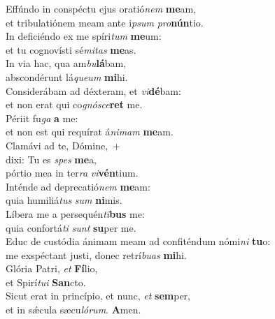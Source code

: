 \evenverse Effúndo in conspéctu ejus oratió\textit{nem} \textbf{me}am,~\*\\
\evenverse et tribulatiónem meam ante i\textit{psum} \textit{pro}\textbf{nún}tio.\\
\oddverse In deficiéndo ex me spíri\textit{tum} \textbf{me}um:~\*\\
\oddverse et tu cognovísti sé\textit{mi}\textit{tas} \textbf{me}as.\\
\evenverse In via hac, qua am\textit{bu}\textbf{lá}bam,~\*\\
\evenverse abscondérunt lá\textit{que}\textit{um} \textbf{mi}hi.\\
\oddverse Considerábam ad déxteram, et \textit{vi}\textbf{dé}bam:~\*\\
\oddverse et non erat qui co\textit{gnó}\textit{sce}\textbf{ret} me.\\
\evenverse Périit fu\textit{ga} \textbf{a} me:~\*\\
\evenverse et non est qui requírat á\textit{ni}\textit{mam} \textbf{me}am.\\
\oddverse Clamávi ad te, Dómine,~+\\
\oddverse  dixi: Tu es \textit{spes} \textbf{me}a,~\*\\
\oddverse pórtio mea in ter\textit{ra} \textit{vi}\textbf{vén}tium.\\
\evenverse Inténde ad deprecatió\textit{nem} \textbf{me}am:~\*\\
\evenverse quia humiliá\textit{tus} \textit{sum} \textbf{ni}mis.\\
\oddverse Líbera me a persequén\textit{ti}\textbf{bus} me:~\*\\
\oddverse quia confortá\textit{ti} \textit{sunt} \textbf{su}per me.\\
\evenverse Educ de custódia ánimam meam ad confiténdum nómi\textit{ni} \textbf{tu}o:~\*\\
\evenverse me exspéctant justi, donec retrí\textit{bu}\textit{as} \textbf{mi}hi.\\
\oddverse Glória Patri, \textit{et} \textbf{Fí}lio,~\*\\
\oddverse et Spirí\textit{tu}\textit{i} \textbf{San}cto.\\
\evenverse Sicut erat in princípio, et nunc, \textit{et} \textbf{sem}per,~\*\\
\evenverse et in sǽcula sæcu\textit{ló}\textit{rum}. \textbf{A}men.\\
